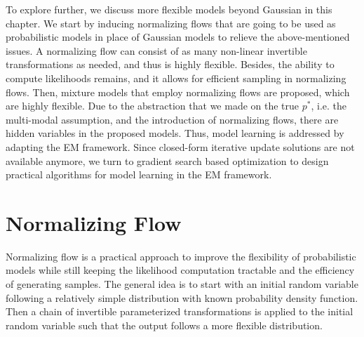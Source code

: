 To explore further, we discuss more flexible models beyond Gaussian in this chapter. We start by inducing normalizing flows that are going to be used as probabilistic models in place of Gaussian models to relieve the above-mentioned issues. A normalizing flow can consist of as many non-linear invertible transformations as needed, and thus is highly flexible. Besides, the ability to compute likelihoods remains, and it allows for efficient sampling in normalizing flows. Then, mixture models that employ normalizing flows are proposed, which are highly flexible. Due to the abstraction that we made on the true $p^{\ast}$, i.e. the multi-modal assumption, and the introduction of normalizing flows, there are hidden variables in the proposed models. Thus, model learning is addressed by adapting the EM framework. Since closed-form iterative update solutions are not available anymore, we turn to gradient search based optimization to design practical algorithms for model learning in the EM framework.


\section{Normalizing Flow}
\label{chpt6:sec:flow}
Normalizing flow is a practical approach to improve the flexibility of probabilistic models while still keeping the likelihood computation tractable and the efficiency of generating samples. The general idea is to start with an initial random variable following a relatively simple distribution with known probability density function. Then a chain of invertible parameterized transformations is applied to the initial random variable such that the output follows a more flexible distribution.

